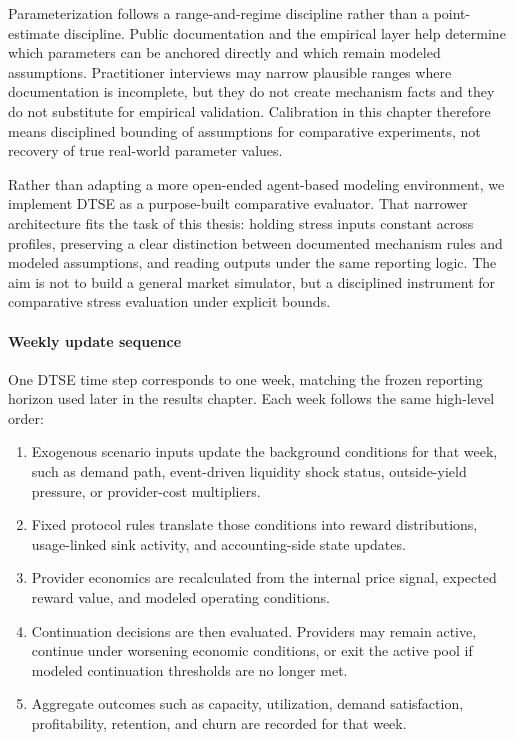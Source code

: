 Parameterization follows a range-and-regime discipline rather than a point-estimate discipline. Public documentation and the empirical layer help determine which parameters can be anchored directly and which remain modeled assumptions. Practitioner interviews may narrow plausible ranges where documentation is incomplete, but they do not create mechanism facts and they do not substitute for empirical validation. Calibration in this chapter therefore means disciplined bounding of assumptions for comparative experiments, not recovery of true real-world parameter values.

Rather than adapting a more open-ended agent-based modeling environment, we implement DTSE as a purpose-built comparative evaluator. That narrower architecture fits the task of this thesis: holding stress inputs constant across profiles, preserving a clear distinction between documented mechanism rules and modeled assumptions, and reading outputs under the same reporting logic. The aim is not to build a general market simulator, but a disciplined instrument for comparative stress evaluation under explicit bounds.

\paragraph{Weekly update sequence}
One DTSE time step corresponds to one week, matching the frozen reporting horizon used later in the results chapter. Each week follows the same high-level order:
\begin{enumerate}
    \item Exogenous scenario inputs update the background conditions for that week, such as demand path, event-driven liquidity shock status, outside-yield pressure, or provider-cost multipliers.
    \item Fixed protocol rules translate those conditions into reward distributions, usage-linked sink activity, and accounting-side state updates.
    \item Provider economics are recalculated from the internal price signal, expected reward value, and modeled operating conditions.
    \item Continuation decisions are then evaluated. Providers may remain active, continue under worsening economic conditions, or exit the active pool if modeled continuation thresholds are no longer met.
    \item Aggregate outcomes such as capacity, utilization, demand satisfaction, profitability, retention, and churn are recorded for that week.
\end{enumerate}

